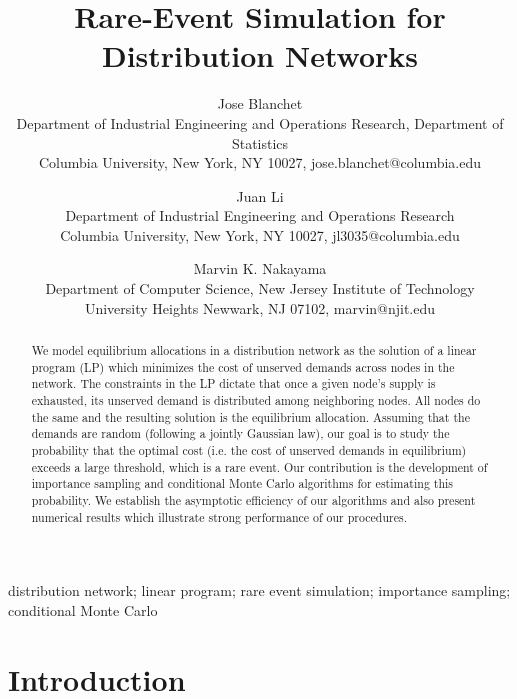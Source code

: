 \documentclass[final,11pt,3p]{article}\usepackage{setspace}
\providecommand{\keywords}[1]{{\textit{Key words:}} #1}
\begin{document}
\title{Rare-Event Simulation for Distribution Networks}
\author{Jose Blanchet \\Department of Industrial Engineering and Operations Research, Department of Statistics\\ Columbia University, New York, NY 10027, jose.blanchet@columbia.edu\\\vspace{0.2cm}
\and Juan Li \\Department of Industrial Engineering and Operations Research\\Columbia University, New York, NY 10027, jl3035@columbia.edu\\\vspace{0.2cm}
\and Marvin K. Nakayama\\Department of Computer Science, New Jersey Institute of Technology\\ University Heights Newwark, NJ 07102, marvin@njit.edu
}
\maketitle

\begin{abstract}
\noindent We model equilibrium allocations in a distribution network as the solution of
a linear program (LP) which minimizes the cost of unserved demands across nodes in the network. The constraints in the LP dictate that once a given
node's supply is exhausted, its unserved demand is distributed among
neighboring nodes. All nodes do the same and the resulting solution is the
equilibrium allocation. Assuming that the demands are random (following a
jointly Gaussian law), our goal is to study the probability that the optimal
cost (i.e. the cost of unserved demands in equilibrium) exceeds a large
threshold, which is a rare event. Our contribution is the development of
importance sampling and conditional Monte Carlo algorithms for estimating this
probability. We establish the asymptotic efficiency of our algorithms and also
present numerical results which illustrate strong performance of our procedures.
\end{abstract}

\noindent\keywords{ distribution network; linear program; rare event simulation; importance sampling; conditional Monte Carlo }

\section{Introduction}
\end{document}
